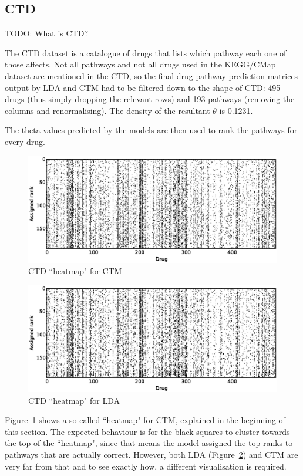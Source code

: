 \documentclass[12pt,a4paper,twoside,openright]{report}
\begin{document}
\subsection{CTD}

TODO: What is CTD?

The CTD dataset is a catalogue of drugs that lists which pathway each one of those affects. Not all pathways and not all drugs used in the KEGG/CMap dataset are mentioned in the CTD, so the final drug-pathway prediction matrices output by LDA and CTM had to be filtered down to the shape of CTD: 495 drugs (thus simply dropping the relevant rows) and 193 pathways (removing the columns and renormalising). The density of the resultant $\theta$ is 0.1231.

The theta values predicted by the models are then used to rank the pathways for every drug.

\begin{figure}[!htb]
\includegraphics[width=\textwidth]{ctm-ctd-heatmap.eps}
\caption{CTD ``heatmap" for CTM}
\label{fig:ctm-ctd-heatmap}
\end{figure}

\begin{figure}[!htb]
\includegraphics[width=\textwidth]{lda-ctd-heatmap.eps}
\caption{CTD ``heatmap" for LDA}
\label{fig:lda-ctd-heatmap}
\end{figure}

Figure~\ref{fig:ctm-ctd-heatmap} shows a so-called ``heatmap" for CTM, explained in the beginning of this section. The expected behaviour is for the black squares to cluster towards the top of the ``heatmap", since that means the model assigned the top ranks to pathways that are actually correct. However, both LDA (Figure~\ref{fig:lda-ctd-heatmap}) and CTM are very far from that and to see exactly how, a different visualisation is required.
\end{document}
